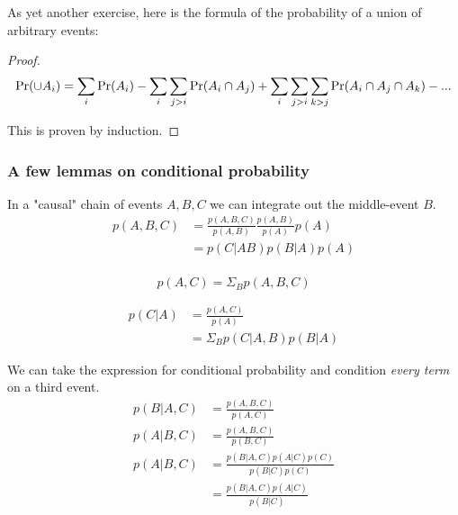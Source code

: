 As yet another exercise, here is the formula of the probability of a union of arbitrary events: 

\begin{proof}
    $$ \operatorname{Pr} (\cup A_i) = \sum_i \operatorname{Pr}(A_i) 
            - \sum_i \sum_{j>i} \operatorname{Pr}(A_i \cap A_j) 
            + \sum_i \sum_{j>i} \sum_{k>j} \operatorname{Pr}(A_i \cap A_j \cap A_k) 
            - ...  $$
    
    This is proven by induction. 
                
    
    
\end{proof}

\subsubsection{A few lemmas on conditional probability} \label{condPropLemmas}

In a "causal" chain of events $A, B, C$ we can integrate out the middle-event $B$.
\begin{equation}
    \begin{aligned}
        p(A, B, C)  &= \frac{p(A, B, C)}{p(A, B)} \frac{p(A, B)}{p(A)} p(A) \\
                    &= p(C|AB) p(B|A) p(A) \\
    \end{aligned}
\end{equation}

\begin{equation}
    p(A, C) = \Sigma_B p(A, B, C)
\end{equation}

\begin{equation}
    \begin{aligned}
            p(C | A) &= \frac{p(A, C)}{p(A)} \\
                     &= \Sigma_B p(C|A, B) p(B|A)
    \end{aligned}
\end{equation}

We can take the expression for conditional probability and condition \emph{every term} on a third event.
\begin{equation}
    \begin{aligned}
        p(B|A, C) &= \frac{p(A, B, C)}{p(A, C)} \\
        p(A|B, C) &= \frac{p(A, B, C)}{p(B, C)} \\
        p(A|B, C) &= \frac{p(B|A, C) p(A|C) p(C)}{p(B|C)p(C)} \\
                  &= \frac{p(B|A, C) p(A|C)}{p(B|C)} \\
    \end{aligned}
\end{equation}


